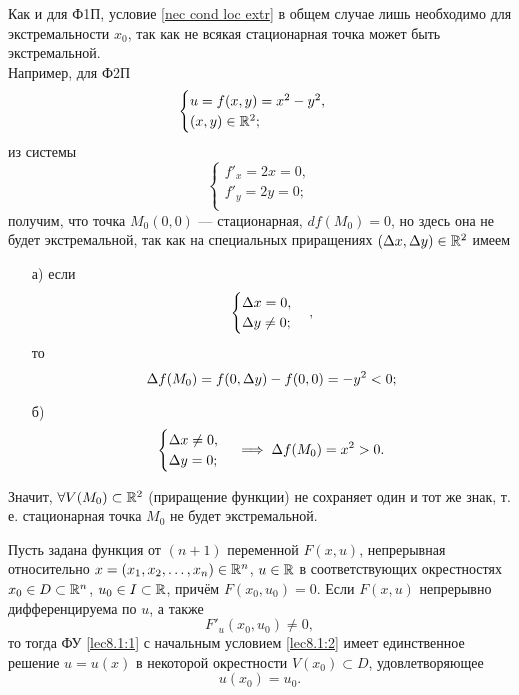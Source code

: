 \documentclass[../main.tex]{subfiles}
\begin{document}
\begin{rem}
		Как и для Ф1П, условие \eqref{nec cond loc extr} в общем случае
		лишь необходимо для экстремальности $x_0$, так как не всякая
		стационарная точка может быть экстремальной. \\
		Например, для Ф2П
		\[
		\begin{cases}
			u = f (x, y) = x^2 - y^2, \\
			(x, y) \in \mathbb{R}^2; \\
		\end{cases}
		\]
		из системы
		\[
		\begin{cases}
			f'_x = 2x = 0, \\
			f'_y = 2y = 0; \\
		\end{cases}
		\]
		получим, что точка $M_0 (0, 0)$ --- стационарная,
		$df (M_0) = 0$,
		но здесь она не будет экстремальной, так как на специальных приращениях
		$(\Delta x, \Delta y) \in \mathbb{R}^2$ имеем
		\begin{enumerate}
			\item[а)]
			если
			\[
			\begin{cases}
				\Delta x = 0, \\
				\Delta y \ne 0; \\
			\end{cases},
			\]
			то
			\[
				\Delta f (M_0)
				= f (0, \Delta y) - f (0, 0)
				= -y^2 < 0;
			\]
			
			\item[б)]
			\[
			\begin{cases}
				\Delta x \ne 0, \\
				\Delta y = 0; \\
			\end{cases}
			\implies
			\Delta f (M_0)
			= x^2 > 0.
			\]
		\end{enumerate}
		Значит, $\forall V (M_0) \subset \mathbb{R}^2$ (приращение функции)
		не сохраняет один и тот же знак, т. е. стационарная точка $M_0$
		не будет экстремальной.
	\end{rem}
\begin{thm}
		Пусть задана функция от $(n+1)$ переменной $F(x, u)$, непрерывная 
		относительно $x = (x_1, x_2, \ldots,
	 	x_n) \in \mathbb{R}^n$, $u \in \mathbb{R}$ в соответствующих окрестностях $x_0 \in D 
	 	\subset \mathbb{R}^n$, $u_0 \in I \subset \mathbb{R}$, причём $F(x_0,u_0)=0$. Если $F(x,u)$ 
	 	непрерывно дифференцируема по $u$, а также 
		\begin{equation}
			F'_u(x_0, u_0) \ne 0, \label{lec8.1:4}
		\end{equation}
		то тогда ФУ \eqref{lec8.1:1} с начальным условием \eqref{lec8.1:2} имеет 
		единственное решение $u = u(x)$ в некоторой окрестности $V(x_0) 
		\subset D$, удовлетворяющее
	 	\begin{equation}
			u(x_0) = u_0. \label{lec8.1:5}
		\end{equation}
	 \end{thm}
\end{document}
